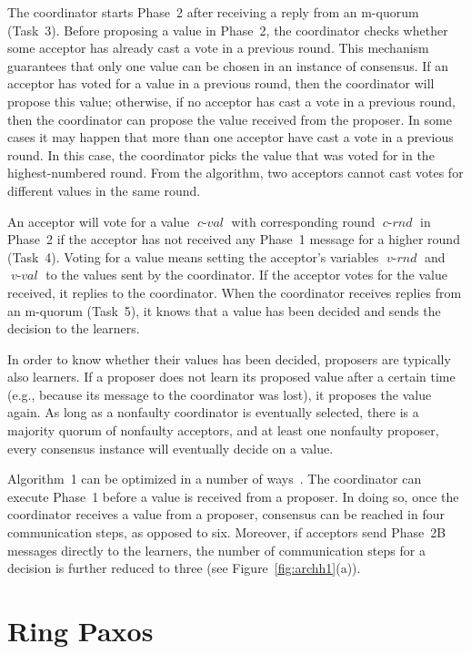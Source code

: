 \documentclass[final,3p,times,twocolumn,authoryear]{elsarticle}
\newcommand{\mv}[1]{\ensuremath{\operatorname{\mathit{#1}}}}
\begin{document}
The coordinator starts Phase~2 after receiving a reply from an m-quorum (Task~3). Before proposing a value in Phase~2, the coordinator checks whether some acceptor has already cast a vote in a previous round. This mechanism guarantees that only one value can be chosen in an instance of consensus. If an acceptor has voted for a value in a previous round, then the coordinator will propose this value; otherwise, if no acceptor has cast a vote in a previous round, then the coordinator can propose the value received from the proposer. In some cases it may happen that more than one acceptor have cast a vote in a previous round. In this case, the coordinator picks the value that was voted for in the highest-numbered round. From the algorithm, two acceptors cannot cast votes for different values in the same round.

An acceptor will vote for a value \mv{c-val} with corresponding round \mv{c-rnd} in Phase~2 if the acceptor has not received any Phase~1 message for a higher round (Task~4). Voting for a value means setting the acceptor's variables \mv{v-rnd} and \mv{v-val} to the values sent by the coordinator. If the acceptor votes for the value received, it replies to the coordinator. When the coordinator receives replies from an m-quorum (Task~5), it knows that a value has been decided and sends the decision to the learners.

In order to know whether their values has been decided, proposers are typically also learners. If a proposer does not learn its proposed value after a certain time (e.g., because its message to the coordinator was lost), it proposes the value again. As long as a nonfaulty coordinator is eventually selected, there is a majority quorum of nonfaulty acceptors, and at least one nonfaulty proposer, every consensus instance will eventually decide on a value.





Algorithm~1 can be optimized in a number of ways~\cite{Lam98}. The coordinator can execute Phase~1 before a value is received from a proposer. In doing so, once the coordinator receives a value from a proposer, consensus can be reached in four communication steps, as opposed to six. Moreover, if acceptors send Phase~2B messages directly to the learners, the number of communication steps for a decision is further reduced to three (see Figure~\ref{fig:archh1}(a)). 

\section{Ring Paxos}
\label{sec:rpaxos}
\end{document}

